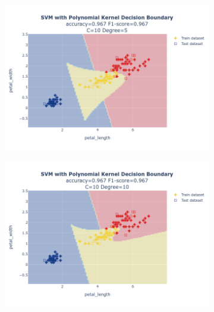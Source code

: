 \documentclass{article}
\begin{document}
\begin{figure}
\begin{subfigure}{0.3\textwidth}
        \includegraphics[scale=.13]{images/implementation/q1/polynomial_kernel/petal_length_petal_width_10_5.png}
    \end{subfigure}
    \hfill
    \begin{subfigure}{0.3\textwidth}
        \centering
        \includegraphics[scale=.13]{images/implementation/q1/polynomial_kernel/petal_length_petal_width_10_10.png}
    \end{subfigure}
    \newline
    \begin{subfigure}{0.3\textwidth}
        \centering

\end{subfigure}
\end{figure}
\end{document}
